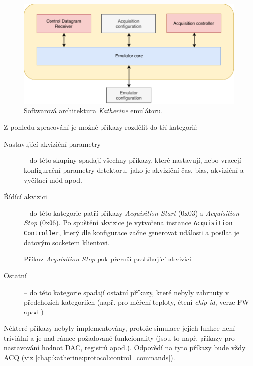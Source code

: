 \begin{figure}[h]
	\begin{center}
		\includegraphics[width=14cm]{figures/katherine_emulator_arch.pdf}
		\caption{Softwarová architektura \textit{Katherine} emulátoru.}
		\label{fig:katherine:emulator:arch}
	\end{center}
\end{figure}

Z pohledu zpracování je možné příkazy rozdělit do tří kategorií:
\begin{description}
    \item[Nastavující akviziční parametry] -- do této skupiny spadají všechny příkazy, které nastavují, nebo vracejí konfigurační parametry detektoru, jako je akviziční čas, bias, akviziční a vyčítací mód apod.
    \item[Řídící akvizici] -- do této kategorie patří příkazy \textit{Acquisition Start} (0x03) a \textit{Acquisition Stop} (0x06). Po spuštění akvizice je vytvořena instance \texttt{Acquisition Controller}, který dle konfigurace začne generovat události a posílat je datovým socketem klientovi.
    
    Příkaz \textit{Acquisition Stop} pak přeruší probíhající akvizici.
    \item[Ostatní] -- do této kategorie spadají ostatní příkazy, které nebyly zahrnuty v předchozích kategoriích (např. pro měření teploty, čtení \textit{chip id}, verze FW apod.).
\end{description}

Některé příkazy nebyly implementovány, protože simulace jejich funkce není triviální a je nad rámec požadované funkcionality (jsou to např. příkazy pro nastavování hodnot DAC, registrů apod.). Odpovědí na tyto příkazy bude vždy ACQ (viz \ref{chap:katherine:protocol:control_commands}).

